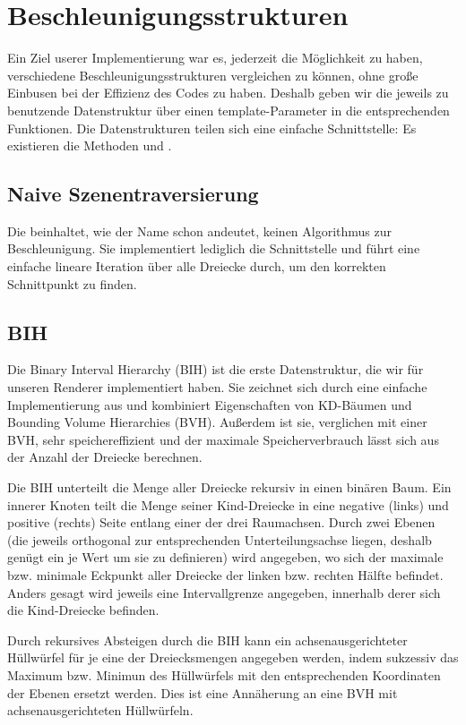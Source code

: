 \section{Beschleunigungsstrukturen}

Ein Ziel userer Implementierung war es, jederzeit die Möglichkeit zu haben, verschiedene Beschleunigungsstrukturen vergleichen zu können, ohne große Einbusen bei der Effizienz des Codes zu haben. Deshalb geben wir die jeweils zu benutzende Datenstruktur über einen template-Parameter in die entsprechenden Funktionen. Die Datenstrukturen teilen sich eine einfache Schnittstelle: Es existieren die Methoden  und .

\subsection{Naive Szenentraversierung}

Die  beinhaltet, wie der Name schon andeutet, keinen Algorithmus zur Beschleunigung. Sie implementiert lediglich die Schnittstelle und führt eine einfache lineare Iteration über alle Dreiecke durch, um den korrekten Schnittpunkt zu finden.

\subsection{BIH}
\label{ssec:bih}

Die Binary Interval Hierarchy (BIH) ist die erste Datenstruktur, die wir für unseren Renderer implementiert haben. Sie zeichnet sich durch eine einfache Implementierung aus und kombiniert Eigenschaften von KD-Bäumen und Bounding Volume Hierarchies (BVH). Außerdem ist sie, verglichen mit einer BVH, sehr speichereffizient und der maximale Speicherverbrauch lässt sich aus der Anzahl der Dreiecke berechnen.

Die BIH unterteilt die Menge aller Dreiecke rekursiv in einen binären Baum. Ein innerer Knoten teilt die Menge seiner Kind-Dreiecke in eine negative (links) und positive (rechts) Seite entlang einer der drei Raumachsen. Durch zwei Ebenen (die jeweils orthogonal zur entsprechenden Unterteilungsachse liegen, deshalb genügt ein je  Wert um sie zu definieren) wird angegeben, wo sich der maximale bzw. minimale Eckpunkt aller Dreiecke der linken bzw. rechten Hälfte befindet. Anders gesagt wird jeweils eine Intervallgrenze angegeben, innerhalb derer sich die Kind-Dreiecke befinden.

Durch rekursives Absteigen durch die BIH kann ein achsenausgerichteter Hüllwürfel für je eine der Dreiecksmengen angegeben werden, indem sukzessiv das Maximum bzw. Minimun des Hüllwürfels mit den entsprechenden Koordinaten der Ebenen ersetzt werden. Dies ist eine Annäherung an eine BVH mit achsenausgerichteten Hüllwürfeln.

